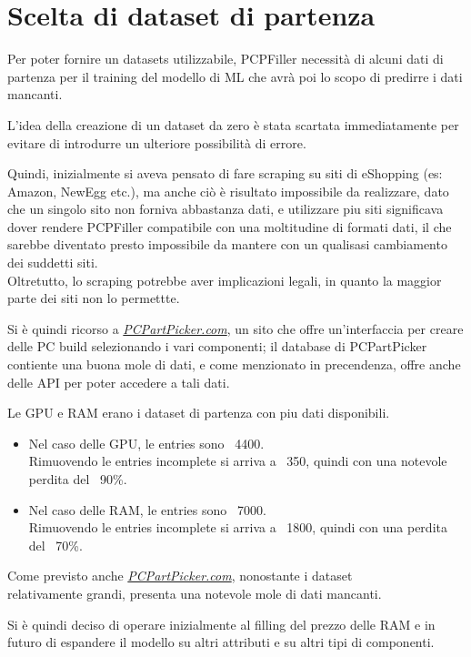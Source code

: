 \documentclass[12pt]{report}
\begin{document}
\newpage
\section{Scelta di dataset di partenza}
Per poter fornire un datasets utilizzabile, PCPFiller necessità di alcuni dati di partenza per il
training del modello di ML che avrà poi lo scopo di predirre i dati mancanti.

L'idea della creazione di un dataset da zero è stata scartata immediatamente per evitare di introdurre
un ulteriore possibilità di errore.

Quindi, inizialmente si aveva pensato di fare scraping su siti di eShopping (es: Amazon, NewEgg etc.),
ma anche ciò è risultato impossibile da realizzare, dato che un singolo sito non forniva abbastanza dati,
e utilizzare piu siti significava dover rendere PCPFiller compatibile con una moltitudine di formati
dati, il che sarebbe diventato presto impossibile da mantere con un qualisasi cambiamento dei suddetti siti.\\
Oltretutto, lo scraping potrebbe aver implicazioni legali, in quanto la maggior parte dei siti non lo permettte.

Si è quindi ricorso a \underline{\textit{PCPartPicker.com}}, un sito che offre un'interfaccia per
creare delle PC build selezionando i vari componenti; il database di PCPartPicker contiente una buona
mole di dati, e come menzionato in precendenza, offre anche delle API per poter accedere a tali dati.

Le GPU e RAM erano i dataset di partenza con piu dati disponibili.
\begin{itemize}
	\item Nel caso delle GPU, le entries sono ~4400.\\
		Rimuovendo le entries incomplete si arriva a ~350, quindi con una notevole perdita del ~90\%.
	\item Nel caso delle RAM, le entries sono ~7000.\\
		Rimuovendo le entries incomplete si arriva a ~1800, quindi con una perdita del ~70\%.
\end{itemize}
Come previsto anche \underline{\textit{PCPartPicker.com}}, nonostante i dataset \\relativamente grandi,
presenta una notevole mole di dati mancanti.

Si è quindi deciso di operare inizialmente al filling del prezzo delle RAM e in futuro di espandere
il modello su altri attributi e su altri tipi di componenti.
\end{document}
